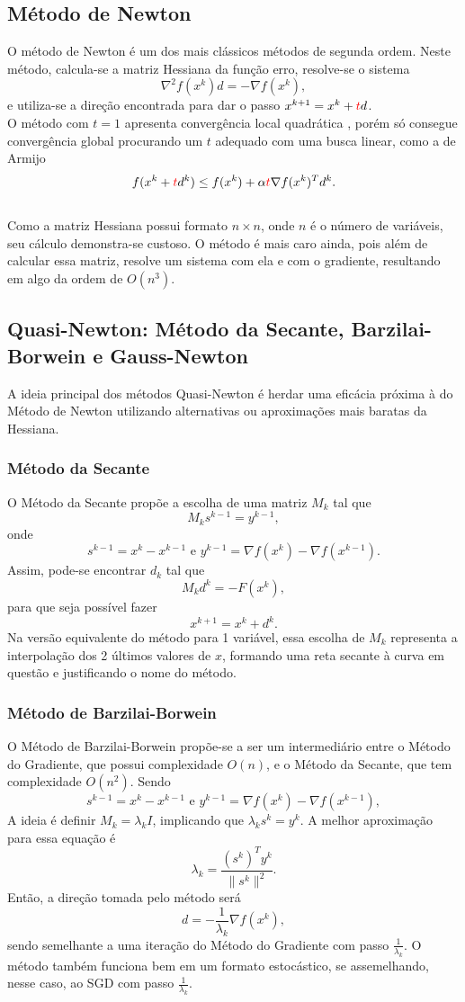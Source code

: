 \documentclass[11pt]{article}
\begin{document}
\subsection*{Método de Newton}
O método de Newton é um dos mais clássicos métodos de segunda ordem. Neste método, calcula-se a matriz Hessiana da função erro, resolve-se o sistema  $$\nabla ^2 f(x^k)d = -\nabla f(x^k),$$ e utiliza-se a direção encontrada para dar o passo $x^{k + 1} = x^k + {\color {red}t}  d$.\\
O método com $t = 1$ apresenta convergência local quadrática \cite{newtonJM}, porém só consegue convergência global procurando um $t$ adequado com uma busca linear, como a de Armijo \cite{armijo1966} $$f(x^k+{\color {red}t}d^k) \leq f(x^k)+\alpha {\color {red}t} \nabla f(x^k)^T d^k.$$\\Como a matriz Hessiana possui formato $n \times n$, onde $n$ é o número de variáveis, seu cálculo demonstra-se custoso. O método é mais caro ainda, pois além de calcular essa matriz, resolve um sistema com ela e com o gradiente, resultando em algo da ordem de $O(n^3)$.

\subsection*{Quasi-Newton: Método da Secante, Barzilai-Borwein e Gauss-Newton}
A ideia principal dos métodos Quasi-Newton é herdar uma eficácia próxima à do Método de Newton utilizando alternativas ou aproximações mais baratas da Hessiana.
\subsubsection*{Método da Secante}
O Método da Secante propõe a escolha de uma matriz $M_k$ tal que   
		$$M_k s^{k-1}= y^{k-1} ,$$
		onde $$s^{k-1}=x^k-x^{k-1} \text{ e } y^{k-1}=\nabla f(x^k)- \nabla f(x^{k-1}) .$$
Assim, pode-se encontrar $d_k$ tal que
		$$M_kd^k=-F(x^k)  ,$$
		para que seja possível fazer $$x^{k+1}=x^k+d^k .$$
Na versão equivalente do método para 1 variável, essa escolha de $M_k$ representa a interpolação dos 2 últimos valores de $x$, formando uma reta secante à curva em questão e justificando o nome do método.

\subsubsection*{Método de Barzilai-Borwein}
O Método de Barzilai-Borwein propõe-se a ser um intermediário entre o Método do Gradiente, que possui complexidade $O(n)$, e o Método da Secante, que tem complexidade $O(n^2)$. Sendo 
$$s^{k-1}=x^k-x^{k-1} \text{ e } y^{k-1}=\nabla f(x^k)- \nabla f(x^{k-1}) ,$$
A ideia é definir $M_k = \lambda_k I$, implicando que $\lambda_ks^k=y^k$. A melhor aproximação para essa equação é $$\lambda_k=\frac{(s^k)^Ty^k}{\|s^k\|^2}.$$
Então, a direção tomada pelo método será $$ d = - \frac{1}{\lambda_k} \nabla f(x^k),$$
sendo semelhante a uma iteração do Método do Gradiente com passo $\frac{1}{\lambda _k}$. O método também funciona bem em um formato estocástico, se assemelhando, nesse caso, ao SGD com passo $\frac{1}{\lambda _k}$.
\end{document}
